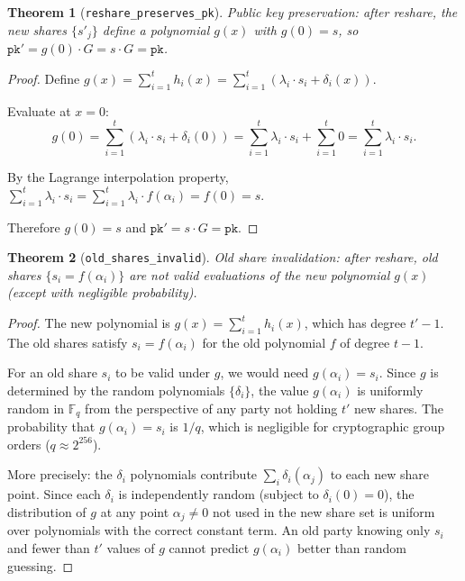 \documentclass[11pt]{article}
\newtheorem{theorem}{Theorem}
\begin{document}
\begin{theorem}[\texttt{reshare\_preserves\_pk}]
Public key preservation: after reshare, the new shares $\{s'_j\}$ define a polynomial $g(x)$ with $g(0) = s$, so $\texttt{pk}' = g(0) \cdot G = s \cdot G = \texttt{pk}$.
\end{theorem}
\begin{proof}
Define $g(x) = \sum_{i=1}^{t} h_i(x) = \sum_{i=1}^{t} (\lambda_i \cdot s_i + \delta_i(x))$.

Evaluate at $x = 0$:
\[
  g(0) = \sum_{i=1}^{t} (\lambda_i \cdot s_i + \delta_i(0)) = \sum_{i=1}^{t} \lambda_i \cdot s_i + \sum_{i=1}^{t} 0 = \sum_{i=1}^{t} \lambda_i \cdot s_i.
\]

By the Lagrange interpolation property, $\sum_{i=1}^{t} \lambda_i \cdot s_i = \sum_{i=1}^{t} \lambda_i \cdot f(\alpha_i) = f(0) = s$.

Therefore $g(0) = s$ and $\texttt{pk}' = s \cdot G = \texttt{pk}$.
\end{proof}

\begin{theorem}[\texttt{old\_shares\_invalid}]
Old share invalidation: after reshare, old shares $\{s_i = f(\alpha_i)\}$ are not valid evaluations of the new polynomial $g(x)$ (except with negligible probability).
\end{theorem}
\begin{proof}
The new polynomial is $g(x) = \sum_{i=1}^{t} h_i(x)$, which has degree $t'-1$. The old shares satisfy $s_i = f(\alpha_i)$ for the old polynomial $f$ of degree $t-1$.

For an old share $s_i$ to be valid under $g$, we would need $g(\alpha_i) = s_i$. Since $g$ is determined by the random polynomials $\{\delta_i\}$, the value $g(\alpha_i)$ is uniformly random in $\mathbb{F}_q$ from the perspective of any party not holding $t'$ new shares. The probability that $g(\alpha_i) = s_i$ is $1/q$, which is negligible for cryptographic group orders ($q \approx 2^{256}$).

More precisely: the $\delta_i$ polynomials contribute $\sum_i \delta_i(\alpha_j)$ to each new share point. Since each $\delta_i$ is independently random (subject to $\delta_i(0) = 0$), the distribution of $g$ at any point $\alpha_j \neq 0$ not used in the new share set is uniform over polynomials with the correct constant term. An old party knowing only $s_i$ and fewer than $t'$ values of $g$ cannot predict $g(\alpha_i)$ better than random guessing.
\end{proof}
\end{document}
